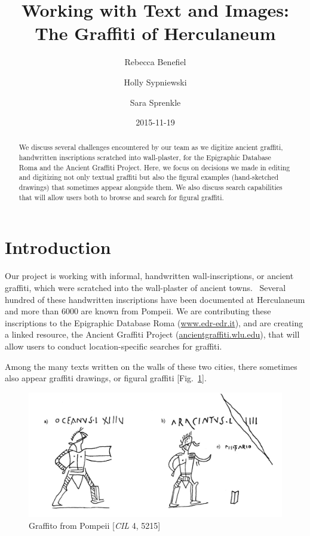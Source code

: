 \documentclass[amsthm,ebook]{saparticle}
\title{Working with Text and Images: The Graffiti of Herculaneum}
\author[WL]{Rebecca Benefiel\corref{first}}
\author[Millisaps]{Holly Sypniewski}
\author[WL]{Sara Sprenkle}\date{2015-11-19}
\begin{document}
\maketitle
\begin{abstract}
We discuss several challenges encountered by our team as we digitize ancient graffiti, handwritten inscriptions scratched into wall-plaster, for the Epigraphic Database Roma and the Ancient Graffiti Project. Here, we focus on decisions we made in editing and digitizing not only textual graffiti but also the figural examples (hand-sketched drawings) that sometimes appear alongside them. We also discuss search capabilities that will allow users both to browse and search for figural graffiti.
\end{abstract}

\section{Introduction}

\noindent Our project is working with informal, handwritten wall-inscriptions, or ancient graffiti, which were scratched into the
wall-plaster of ancient towns. \ Several hundred of these handwritten inscriptions have been documented at Herculaneum
and more than 6000 are known from Pompeii. We are contributing these inscriptions to the Epigraphic Database Roma
(\url{www.edr-edr.it}), and are creating a linked resource, the Ancient Graffiti Project (\url{ancientgraffiti.wlu.edu}), that will
allow users to conduct location-specific searches for graffiti. 

Among the many texts written on the walls of these two cities, there sometimes also appear graffiti drawings, or figural
graffiti [Fig.~\ref{fig:1}]. 

\begin{figure}[!bp]
\centering
 \includegraphics[width=\columnwidth]{EAGLE2016BenefielSypniewski-img001.jpg}
\caption{ Graffito from Pompeii [\emph{CIL} 4, 5215]}
\label{fig:1}
\end{figure}
\end{document}

